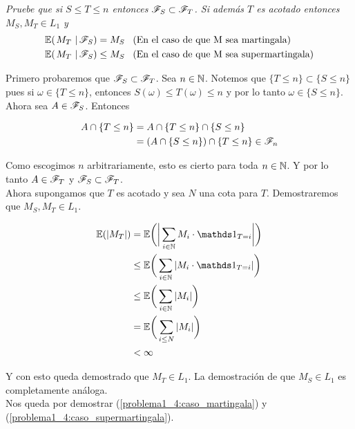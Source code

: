 \emph{
	Pruebe que si $S\leq T\leq n$ entonces $\mathscr{F}_S\subset\mathscr{F}_T$. Si adem\'as $T$ es acotado entonces $M_S,M_T \in L_1$ y 
	\begin{align}
		\espc{M_T}{\F_S} = M_S &\mbox{\;\;\;(En el caso de que M sea martingala)} \label{problema1_4:caso_martingala}\\
		\espc{M_T}{\F_S}\leq M_S &\mbox{\;\;\;(En el caso de que M sea supermartingala)} \label{problema1_4:caso_supermartingala}
	\end{align}	
}

	Primero probaremos que $\mathscr{F}_S \subset \mathscr{F}_T$. Sea $n \in \mathbb{N}$. Notemos que $\{ T \leq n \} \subset \{ S \leq n \}$ pues
	si $\omega \in \{ T \leq n \}$, entonces $S(\omega) \leq T(\omega) \leq n $ y por lo tanto $\omega \in \{ S \leq n \}$.\\

	Ahora sea $A \in \mathscr{F}_S$. Entonces

	\begin{align}
		A \cap \{ T \leq n \} 	&=		A  \cap \{ T \leq n \} \cap \{ S \leq n \} \\
								&=		(A  \cap \{ S \leq n \}) \cap \{ T \leq n \} \in \mathscr{F}_n
	\end{align}

	Como escogimos $n$ arbitrariamente, esto es cierto para toda $n \in \mathbb{N}$. Y por lo tanto $A \in \mathscr{F}_T$ y $\mathscr{F}_S \subset \mathscr{F}_T$.\\

	Ahora supongamos que $T$ es acotado y sea $N$ una cota para $T$. Demostraremos que $M_S,M_T \in L_1$.
	
	\begin{align}
		\E(|M_T|) 	&=		\E\bigg(	\bigg| \sum_{i \in \N} M_i \cdot \indic_{T = i} \bigg|	\bigg) \\ 
					&\leq	\E\bigg(	\sum_{i \in \N} |M_i \cdot \indic_{T = i} |				\bigg) \\
					&\leq	\E\bigg(	\sum_{i \in \N} |M_i|									\bigg) \\
					&=		\E\bigg(	\sum_{i \leq N} |M_i|									\bigg) \\
					&< 		\infty
	\end{align}
	
	Y con esto queda demostrado que $M_T \in L_1$. La demostración de que $M_S \in L_1$ es completamente análoga.\\
	
	Nos queda por demostrar (\ref{problema1_4:caso_martingala}) y (\ref{problema1_4:caso_supermartingala}).\\
	
